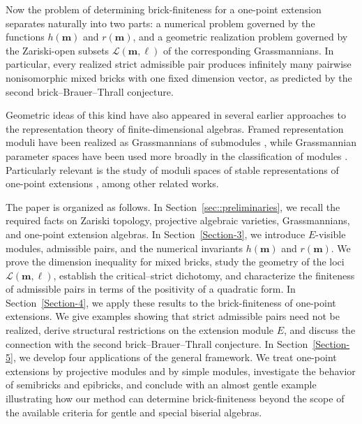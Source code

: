 \documentclass[a4,12pt]{amsart}
\numberwithin{equation}{section} %
\theoremstyle{definition} %
\begin{document}
Now the problem of determining brick-finiteness for a one-point extension separates naturally into two parts: a numerical problem governed by the functions $h(\mathbf{m})$ and $r(\mathbf{m})$, and a geometric realization problem governed by the Zariski-open subsets $\mathcal{L}(\mathbf{m},\ell)$ of the corresponding Grassmannians. In particular, every realized strict admissible pair produces infinitely many pairwise nonisomorphic mixed bricks with one fixed dimension vector, as predicted by the second brick--Brauer--Thrall conjecture.

Geometric ideas of this kind have also appeared in several earlier approaches to the representation theory of finite-dimensional algebras. Framed representation moduli have been realized as Grassmannians of submodules \cite{FedotovFramedModuli}, while Grassmannian parameter spaces have been used more broadly in the classification of modules \cite{HuisgenZimmermannGrassmannians}. Particularly relevant is the study of moduli spaces of stable representations of one-point extensions \cite{DonmezReinekeOnePointModuli}, among other related works.

The paper is organized as follows. In Section~\ref{sec::preliminaries}, we recall the required facts on Zariski topology, projective algebraic varieties, Grassmannians, and one-point extension algebras. In Section~\ref{Section-3}, we introduce $E$-visible modules, admissible pairs, and the numerical invariants $h(\mathbf{m})$ and $r(\mathbf{m})$. We prove the dimension inequality for mixed bricks, study the geometry of the loci $\mathcal{L}(\mathbf{m},\ell)$, establish the critical--strict dichotomy, and characterize the finiteness of admissible pairs in terms of the positivity of a quadratic form. In Section~\ref{Section-4}, we apply these results to the brick-finiteness of one-point extensions. We give examples showing that strict admissible pairs need not be realized, derive structural restrictions on the extension module $E$, and discuss the connection with the second brick--Brauer--Thrall conjecture. In Section~\ref{Section-5}, we develop four applications of the general framework. We treat one-point extensions by projective modules and by simple modules, investigate the behavior of semibricks and epibricks, and conclude with an almost gentle example illustrating how our method can determine brick-finiteness beyond the scope of the available criteria for gentle and special biserial algebras.
\end{document}
